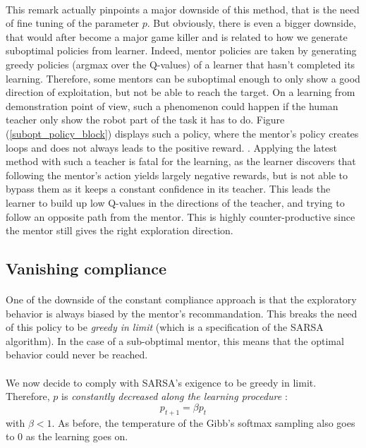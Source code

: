 \documentclass[a4paper]{report}
\begin{document}
{{{			\paragraph{} This remark actually pinpoints a major downside of this method, that is the need of fine tuning of the parameter $p$. But obviously, there is even a bigger downside, that would after become a major game killer and is related to how we generate suboptimal policies from learner. Indeed, mentor policies are taken by generating greedy policies (argmax over the Q-values) of a learner that hasn't completed its learning. Therefore, some mentors can be suboptimal enough to only show a good direction of exploitation, but not be able to reach the target. On a learning from demonstration point of view, such a phenomenon could happen if the human teacher only show the robot part of the task it has to do. Figure (\ref{subopt_policy_block}) displays such a policy, where the mentor's policy creates loops and does not always leads to the positive reward.  \newline. 
			Applying the latest method with such a teacher is fatal for the learning, as the learner discovers that following the mentor's action yields largely negative rewards, but is not able to bypass them as it keeps a constant confidence in its teacher. This leads the learner to build up low Q-values in the directions of the teacher, and trying to follow an opposite path from the mentor. This is highly counter-productive since the mentor still gives the right exploration direction. 
		
		\subsection{Vanishing compliance }
		{
			\paragraph{} One of the downside of the constant compliance approach is that the exploratory behavior is always biased by the mentor's recommandation. This breaks the need of this policy to be \emph{greedy in limit} (which is a specification of the SARSA algorithm). In the case of a sub-obptimal mentor, this means that the optimal behavior could never be reached. 
			
			\paragraph{} We now decide to comply with SARSA's exigence to be greedy in limit. Therefore, $p$ is \emph{constantly decreased along the learning procedure} : 
			\begin{equation}
				p_{t+1} = \beta p_{t}
			\end{equation}
			with $\beta < 1$. As before, the temperature of the Gibb's softmax sampling also goes to $0$ as the learning goes on. 
			
}}}}
\end{document}
